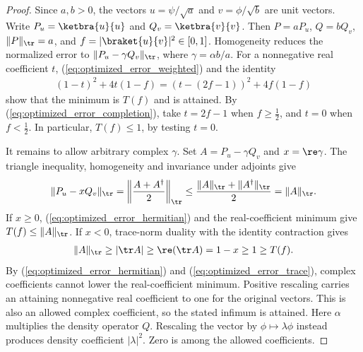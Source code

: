\begin{proof}\leanok
    Since $a,b>0$, the vectors $u=\psi/\sqrt a$ and
    $v=\phi/\sqrt b$ are unit vectors. Write $P_u=\ketbra{u}{u}$ and
    $Q_v=\ketbra{v}{v}$. Then $P=aP_u$, $Q=bQ_v$,
    $\lVert P\rVert_{\tr}=a$, and $f=|\braket{u}{v}|^2\in[0,1]$.
    Homogeneity reduces the normalized error to
    $\lVert P_u-\gamma Q_v\rVert_{\tr}$, where $\gamma=\alpha b/a$.
    For a nonnegative real coefficient $t$, (\ref{eq:optimized_error_weighted})
    and the identity
    \begin{align}
        (1-t)^2+4t(1-f)
        =(t-(2f-1))^2+4f(1-f)
        \label{eq:optimized_error_completion}
    \end{align}
    show that the minimum is $T(f)$ and is attained.
    By (\ref{eq:optimized_error_completion}), take $t=2f-1$ when
    $f\ge\tfrac12$, and $t=0$ when $f<\tfrac12$.
    In particular, $T(f)\le1$, by testing $t=0$.

    It remains to allow arbitrary complex $\gamma$.
    Set $A=P_u-\gamma Q_v$ and $x=\re\gamma$.
    The triangle inequality, homogeneity and invariance under adjoints give
    \begin{align}
        \lVert P_u-xQ_v\rVert_{\tr}
        =\left\lVert\frac{A+A^\dagger}{2}\right\rVert_{\tr}
        \le\frac{\lVert A\rVert_{\tr}+\lVert A^\dagger\rVert_{\tr}}2
        =\lVert A\rVert_{\tr}.
        \label{eq:optimized_error_hermitian}
    \end{align}
    If $x\ge0$, (\ref{eq:optimized_error_hermitian}) and the real-coefficient minimum give
    $T(f)\le\lVert A\rVert_{\tr}$.
    If $x<0$, trace-norm duality with the identity contraction gives
    \begin{align}
        \lVert A\rVert_{\tr}
        \ge|\tr A|\ge\re(\tr A)=1-x\ge1\ge T(f).
        \label{eq:optimized_error_trace}
    \end{align}
    By (\ref{eq:optimized_error_hermitian}) and (\ref{eq:optimized_error_trace}),
    complex coefficients cannot lower the real-coefficient minimum.
    Positive rescaling carries an attaining nonnegative real coefficient
    to one for the original vectors. This is also an allowed complex
    coefficient, so the stated infimum is attained.
    Here $\alpha$ multiplies the density operator $Q$.
    Rescaling the vector by $\phi\mapsto\lambda\phi$ instead produces
    density coefficient $|\lambda|^2$. Zero is among the allowed coefficients.
\end{proof}
